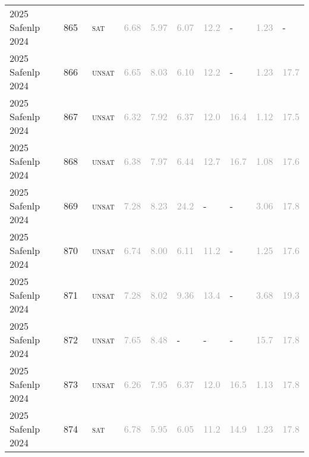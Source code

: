 \begin{center}
{\begin{longtable}{@{}llllllllll@{}}
2025 Safenlp 2024 & 865 & ~\textsc{sat} & \textcolor{darkgray}{6.68} & \textcolor{darkgray}{5.97} & \textcolor{darkgray}{6.07} & \textcolor{darkgray}{12.2} & - & \textcolor{darkgray}{1.23} & - \\
2025 Safenlp 2024 & 866 & ~\textsc{unsat} & \textcolor{darkgray}{6.65} & \textcolor{darkgray}{8.03} & \textcolor{darkgray}{6.10} & \textcolor{darkgray}{12.2} & - & \textcolor{darkgray}{1.23} & \textcolor{darkgray}{17.7} \\
2025 Safenlp 2024 & 867 & ~\textsc{unsat} & \textcolor{darkgray}{6.32} & \textcolor{darkgray}{7.92} & \textcolor{darkgray}{6.37} & \textcolor{darkgray}{12.0} & \textcolor{darkgray}{16.4} & \textcolor{darkgray}{1.12} & \textcolor{darkgray}{17.5} \\
2025 Safenlp 2024 & 868 & ~\textsc{unsat} & \textcolor{darkgray}{6.38} & \textcolor{darkgray}{7.97} & \textcolor{darkgray}{6.44} & \textcolor{darkgray}{12.7} & \textcolor{darkgray}{16.7} & \textcolor{darkgray}{1.08} & \textcolor{darkgray}{17.6} \\
2025 Safenlp 2024 & 869 & ~\textsc{unsat} & \textcolor{darkgray}{7.28} & \textcolor{darkgray}{8.23} & \textcolor{darkgray}{24.2} & - & - & \textcolor{darkgray}{3.06} & \textcolor{darkgray}{17.8} \\
2025 Safenlp 2024 & 870 & ~\textsc{unsat} & \textcolor{darkgray}{6.74} & \textcolor{darkgray}{8.00} & \textcolor{darkgray}{6.11} & \textcolor{darkgray}{11.2} & - & \textcolor{darkgray}{1.25} & \textcolor{darkgray}{17.6} \\
2025 Safenlp 2024 & 871 & ~\textsc{unsat} & \textcolor{darkgray}{7.28} & \textcolor{darkgray}{8.02} & \textcolor{darkgray}{9.36} & \textcolor{darkgray}{13.4} & - & \textcolor{darkgray}{3.68} & \textcolor{darkgray}{19.3} \\
2025 Safenlp 2024 & 872 & ~\textsc{unsat} & \textcolor{darkgray}{7.65} & \textcolor{darkgray}{8.48} & - & - & - & \textcolor{darkgray}{15.7} & \textcolor{darkgray}{17.8} \\
2025 Safenlp 2024 & 873 & ~\textsc{unsat} & \textcolor{darkgray}{6.26} & \textcolor{darkgray}{7.95} & \textcolor{darkgray}{6.37} & \textcolor{darkgray}{12.0} & \textcolor{darkgray}{16.5} & \textcolor{darkgray}{1.13} & \textcolor{darkgray}{17.8} \\
2025 Safenlp 2024 & 874 & ~\textsc{sat} & \textcolor{darkgray}{6.78} & \textcolor{darkgray}{5.95} & \textcolor{darkgray}{6.05} & \textcolor{darkgray}{11.2} & \textcolor{darkgray}{14.9} & \textcolor{darkgray}{1.23} & \textcolor{darkgray}{17.8} \\

\end{longtable}}
\end{center}
